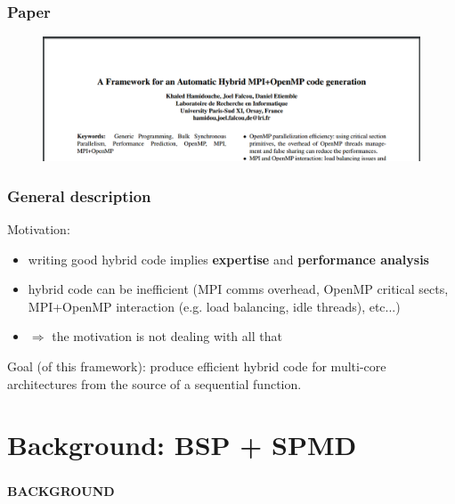 \documentclass{beamer}
\begin{document}
\begin{frame}
\frametitle{Paper}
\begin{figure}
\includegraphics[width=0.8\linewidth]{article-cover}
\end{figure}
\end{frame}

\begin{frame}
\frametitle{General description}

Motivation:

\begin{itemize}
\item writing good hybrid code implies \textbf{expertise} and \textbf{performance analysis}
\item hybrid code can be inefficient (MPI comms overhead, OpenMP critical sects, MPI+OpenMP interaction (e.g. load balancing, idle threads), etc...)
\item $\Rightarrow$ the motivation is not dealing with all that
\end{itemize}

Goal (of this framework): produce efficient hybrid code for multi-core architectures from the source of a sequential function.

\end{frame}





\section{Background: BSP + SPMD}

\begin{frame}
\frametitle{}

\begin{center}
\textbf{BACKGROUND}
\end{center}

\end{frame}
\end{document}
